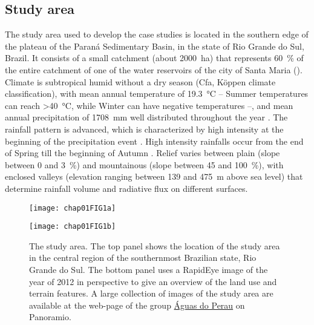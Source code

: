 \subsection{Study area}
\label{sec:intro-study-area}

The study area used to develop the case studies is located in the southern edge of the plateau of the
Paraná Sedimentary Basin, in the state of Rio Grande do Sul, Brazil. It consists of a small catchment
(about \SI{2000}{\hectare}) that represents \SI{60}{\percent} of the entire catchment of one of the
water reservoirs of the city of Santa Maria (). Climate is subtropical humid
without a dry season (Cfa, Köppen climate classification), with mean annual temperature of
\SI{19.3}{\celsius} -- Summer temperatures can reach \SI{>40}{\celsius}, while Winter can have negative
temperatures \cite{HeldweinEtAl2009} --, and mean annual precipitation of \SI{1708}{\milli\metre} well
distributed throughout the year \cite{Maluf2000}. The rainfall pattern is advanced, which is
characterized by high intensity at the beginning of the precipitation event \cite{MehlEtAl2001}.
High intensity rainfalls occur from the end of Spring till the beginning of Autumn
\cite{MouraBueno2012}. Relief varies between plain (slope between \num{0} and \SI{3}{\percent}) and
mountainous (slope between \num{45} and \SI{100}{\percent}), with enclosed valleys (elevation
ranging between \num{139} and \SI{475}{\metre} above sea level) that determine rainfall volume and
radiative flux on different surfaces.

\begin{figure}[!ht]
   \centering
   \begin{minipage}[b]{95mm}
     \subcaption{}
     \label{fig:brazil}
     \centering
     \texttt{[image: chap01FIG1a]}
   \end{minipage}
   \begin{minipage}[b]{95mm}
     \subcaption{}
     \label{fig:points}
     \centering
     \texttt{[image: chap01FIG1b]}
   \end{minipage}
 \caption{The study area. The top panel shows the location of the study area in the central region
 of the southernmost Brazilian state, Rio Grande do Sul. The bottom panel uses a RapidEye image
 of the year of 2012 in perspective to give an overview of the land use and terrain features.
 A large collection of images of the study area are available at the web-page of the group
 \href{http://www.panoramio.com/group/130903}{Águas do Perau} on Panoramio.}
 \label{fig:intro-location}
\end{figure}

